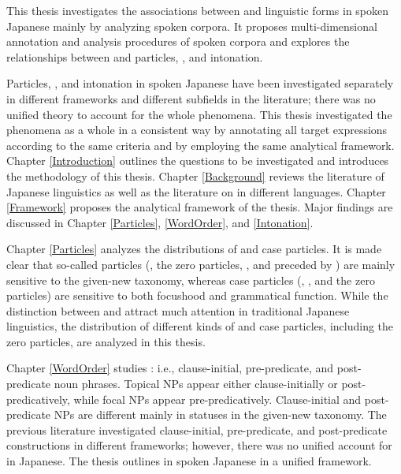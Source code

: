 \label{Abstract}
\begin{refsection}

This thesis investigates the associations between 
and linguistic forms in spoken Japanese
mainly by analyzing spoken corpora.
It proposes multi-dimensional annotation and analysis procedures of spoken corpora and
explores the relationships between 
and particles, , and intonation.

Particles, , and intonation in spoken Japanese have been investigated separately in different frameworks and different subfields in the literature;
there was no unified theory to account for the whole phenomena.
This thesis investigated the phenomena as a whole in a consistent way
by annotating all target expressions according to the same criteria and
by employing the same analytical framework.
Chapter \ref{Introduction} outlines the questions to be investigated and introduces the methodology of this thesis.
Chapter \ref{Background} reviews the literature of Japanese linguistics
as well as the literature on  in different languages.
Chapter \ref{Framework} proposes the analytical framework of the thesis.
Major findings are discussed in Chapter \ref{Particles}, \ref{WordOrder}, and \ref{Intonation}.

Chapter \ref{Particles} analyzes the distributions of  and case particles.
It is made clear that so-called  particles 
(, the zero particles, , and  preceded by ) are mainly sensitive to the given-new taxonomy,
whereas case particles (, , and the zero particles) are sensitive to both focushood and grammatical function.
While the distinction between  and  attract much attention in traditional Japanese linguistics,
the distribution of different kinds of  and case particles, including the zero particles,
are analyzed in this thesis.

Chapter \ref{WordOrder} studies :
i.e., clause-initial, pre-predicate, and post-pred\-i\-cate noun phrases.%
Topical NPs appear either clause-initially or post-pred\-i\-cat\-ively,
while focal NPs appear pre-predicatively.
Clause-initial and post-predicate NPs are different mainly in statuses in the given-new taxonomy.
The previous literature investigated clause-initial, pre-predicate, and post-predicate constructions in different frameworks;
however, there was no unified account for  in Japanese.
The thesis outlines  in spoken Japanese in a unified framework.


\end{refsection}
